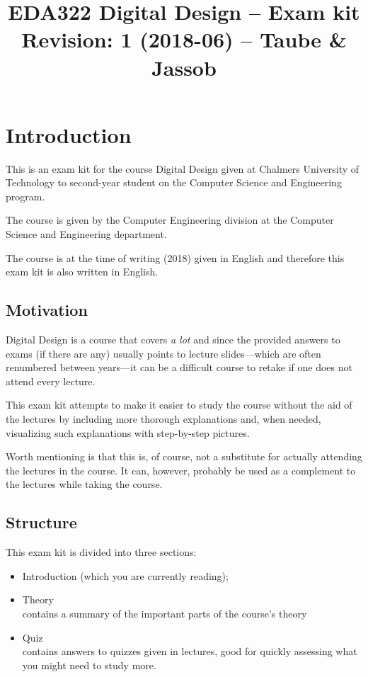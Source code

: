 \documentclass[a4paper,11pt]{report}
\title{EDA322 Digital Design -- Exam kit \\
  \small Revision: 1 (2018-06) -- Taube \& Jassob
}
\begin{document}
\maketitle
\tableofcontents

\newpage

\chapter{Introduction}
This is an exam kit for the course Digital Design given at Chalmers
University of Technology to second-year student on the Computer
Science and Engineering program.

The course is given by the Computer Engineering division at the
Computer Science and Engineering department.

The course is at the time of writing (2018) given in English and
therefore this exam kit is also written in English.

\section{Motivation}
Digital Design is a course that covers \textit{a lot} and since the
provided answers to exams (if there are any) usually points to lecture
slides---which are often renumbered between years---it can be a
difficult course to retake if one does not attend every lecture.

This exam kit attempts to make it easier to study the course without
the aid of the lectures by including more thorough explanations and,
when needed, visualizing such explanations with step-by-step pictures.

Worth mentioning is that this is, of course, not a substitute for
actually attending the lectures in the course. It can, however,
probably be used as a complement to the lectures while taking the
course.

\section{Structure}

This exam kit is divided into three sections:
\begin{itemize}
\item Introduction (which you are currently reading);
\item Theory \\
  contains a summary of the important parts of the course's theory
\item Quiz \\
  contains answers to quizzes given in lectures, good for quickly
  assessing what you might need to study more.
\end{itemize}
\end{document}
